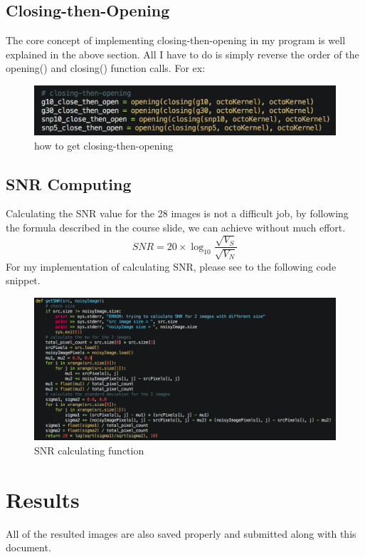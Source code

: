 \documentclass{article}
\begin{document}
\subsection{Closing-then-Opening}
The core concept of implementing closing-then-opening in my program is well explained in the above section. All I have to do is simply reverse the order of the opening() and closing() function calls. For ex:
\begin{figure}[H]
  \includegraphics[width=\linewidth]{img/get_closing_then_opening.png}
  \caption{how to get closing-then-opening}
  \label{fig:closing_then_opening_usage}
\end{figure}

\subsection{SNR Computing}
Calculating the SNR value for the 28 images is not a difficult job, by following the formula described in the course slide, we can achieve without much effort.
\begin{equation}
SNR = 20 \times \log_{10} \frac{\sqrt{V_S}}{\sqrt{V_N}}
\end{equation}
For my implementation of calculating SNR, please see to the following code snippet.
\begin{figure}[H]
  \includegraphics[width=\linewidth]{img/get_snr.png}
  \caption{SNR calculating function}
  \label{fig:snr_calculating_function}
\end{figure}

\section{Results}
All of the resulted images are also saved properly and submitted along with this document.
\end{document}
